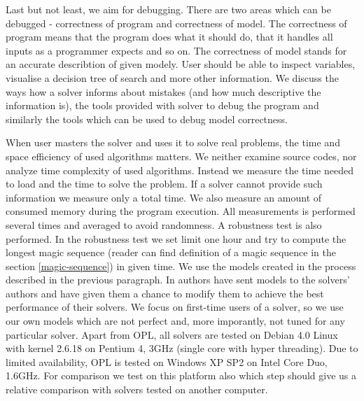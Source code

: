 Last but not least, we aim for debugging. There are two areas which can be 
debugged - correctness of program and correctness of model. The correctness of 
program means that the program does what it should do, that it handles all inputs as a programmer expects and so on. 
The correctness of model stands for an accurate describtion of given modely. User should be able to 
inspect variables, visualise a decision tree of search and more other information. 
We discuss the ways how a solver informs about mistakes (and how much descriptive the 
information is), the tools provided with solver to debug the program and similarly the 
tools which can be used to debug model correctness.

When user masters the solver and uses it to solve real problems, the time and space 
efficiency of used algorithms matters. We neither examine source codes, nor analyze 
time complexity of used algorithms. Instead we measure the time needed to 
load and the time to solve the problem. If a solver cannot provide such information 
we measure only a total time. We also measure an amount of consumed memory 
during the program execution. All measurements is performed several times 
and averaged to avoid randomness. A robustness test is also performed. 
In the robustness test we set limit one hour and try to compute the longest magic 
sequence (reader can find definition of a magic sequence in the section \ref{magic-sequence}) 
in given time. We use the models created in the process described in the previous 
paragraph. In \cite{fernandez00} authors have sent models to the solvers' authors and 
have given them a chance to modify them to achieve the best performance of their solvers. 
We focus on first-time users of a solver, so we use our own models which are 
not perfect and, more imporantly, not tuned for any particular solver. Apart from OPL, all solvers 
are tested on Debian 4.0  Linux with kernel 2.6.18 on Pentium 4, 3GHz (single core 
with hyper threading). Due to limited availability, OPL is tested on Windows XP 
SP2 on Intel Core Duo, 1.6GHz. For comparison we test on this platform also 
\eclipse which step should give us a relative comparison with solvers tested on another 
computer.